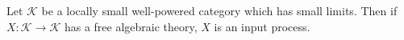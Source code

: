 Let $\mathcal{K}$ be a locally small well-powered category which has small limits. Then if $X : \mathcal{K} \longrightarrow \mathcal{K}$ has a free algebraic theory, $X$ is an input process.
